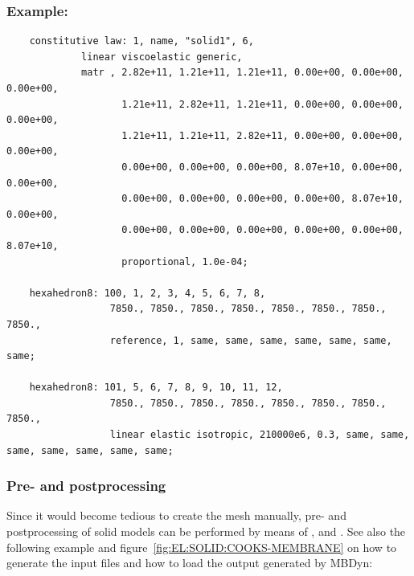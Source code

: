 \subsubsection{Example:}
\begin{verbatim}
    constitutive law: 1, name, "solid1", 6,
             linear viscoelastic generic,
             matr , 2.82e+11, 1.21e+11, 1.21e+11, 0.00e+00, 0.00e+00, 0.00e+00,
                    1.21e+11, 2.82e+11, 1.21e+11, 0.00e+00, 0.00e+00, 0.00e+00,
                    1.21e+11, 1.21e+11, 2.82e+11, 0.00e+00, 0.00e+00, 0.00e+00,
                    0.00e+00, 0.00e+00, 0.00e+00, 8.07e+10, 0.00e+00, 0.00e+00,
                    0.00e+00, 0.00e+00, 0.00e+00, 0.00e+00, 8.07e+10, 0.00e+00,
                    0.00e+00, 0.00e+00, 0.00e+00, 0.00e+00, 0.00e+00, 8.07e+10,
                    proportional, 1.0e-04;

    hexahedron8: 100, 1, 2, 3, 4, 5, 6, 7, 8,
                  7850., 7850., 7850., 7850., 7850., 7850., 7850., 7850.,
                  reference, 1, same, same, same, same, same, same, same;

    hexahedron8: 101, 5, 6, 7, 8, 9, 10, 11, 12,
                  7850., 7850., 7850., 7850., 7850., 7850., 7850., 7850.,
                  linear elastic isotropic, 210000e6, 0.3, same, same, same, same, same, same, same;
\end{verbatim}

\subsubsection{Pre- and postprocessing}
Since it would become tedious to create the mesh manually, pre- and postprocessing of solid models
can be performed by means of ,
and .
See also the following example and figure~\ref{fig:EL:SOLID:COOKS-MEMBRANE} on how to generate the input files and how to load the output generated by MBDyn:

